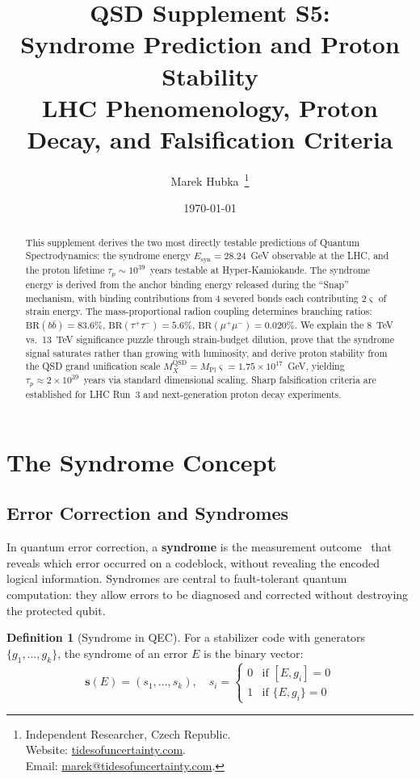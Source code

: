 \documentclass[11pt,a4paper]{article}
\title{
  \textbf{QSD Supplement S5: \\[0.5em] Syndrome Prediction and Proton Stability}\\[0.5em]
  \Large LHC Phenomenology, Proton Decay, and Falsification Criteria\\[1em]
}
\author{
  Marek Hubka\, \orcidlink{0009-0003-2476-9017}
  \thanks{
    Independent Researcher, Czech Republic.\\
    Website: \href{http://www.tidesofuncertainty.com}{tidesofuncertainty.com}.\\
    Email: \href{mailto:marek@tidesofuncertainty.com}{marek@tidesofuncertainty.com}.
  }
}
\date{\today}
\theoremstyle{definition}
\newtheorem{definition}[theorem]{Definition}
\theoremstyle{remark}
\newcommand{\strain}{\varsigma}
\newcommand{\Mpl}{M_{\mathrm{Pl}}}
\newcommand{\MX}{{M_X^{\mathrm{QSD}}}}
\newcommand{\Esyn}{E_{\mathrm{syn}}}
\begin{document}
\maketitle

\begin{abstract}
\noindent This supplement derives the two most directly testable predictions of Quantum Spectrodynamics: the syndrome energy $\Esyn = 28.24$~GeV observable at the LHC, and the proton lifetime $\tau_p \sim 10^{39}$~years testable at Hyper-Kamiokande. The syndrome energy is derived from the anchor binding energy released during the ``Snap'' mechanism, with binding contributions from 4 severed bonds each contributing $2\strain$ of strain energy. The mass-proportional radion coupling determines branching ratios: $\mathrm{BR}(b\bar{b}) = 83.6\%$, $\mathrm{BR}(\tau^+\tau^-) = 5.6\%$, $\mathrm{BR}(\mu^+\mu^-) = 0.020\%$. We explain the 8~TeV vs.\ 13~TeV significance puzzle through strain-budget dilution, prove that the syndrome signal saturates rather than growing with luminosity, and derive proton stability from the QSD grand unification scale $\MX = \Mpl\strain = 1.75 \times 10^{17}$~GeV, yielding $\tau_p \approx 2 \times 10^{39}$~years via standard dimensional scaling. Sharp falsification criteria are established for LHC Run~3 and next-generation proton decay experiments.
\end{abstract}

\tableofcontents
\newpage

\section{The Syndrome Concept}
\label{sec:concept}

\subsection{Error Correction and Syndromes}

In quantum error correction, a \textbf{syndrome} is the measurement outcome~\cite{NielsenChuang2010,Gottesman1997} that reveals which error occurred on a codeblock, without revealing the encoded logical information. Syndromes are central to fault-tolerant quantum computation: they allow errors to be diagnosed and corrected without destroying the protected qubit.

\begin{definition}[Syndrome in QEC]
For a stabilizer code with generators $\{g_1, \ldots, g_k\}$, the syndrome of an error $E$ is the binary vector:
\begin{equation}
\mathbf{s}(E) = (s_1, \ldots, s_k), \quad s_i = \begin{cases} 0 & \text{if } [E, g_i] = 0 \\ 1 & \text{if } \{E, g_i\} = 0 \end{cases}
\end{equation}
\end{definition}
\end{document}
